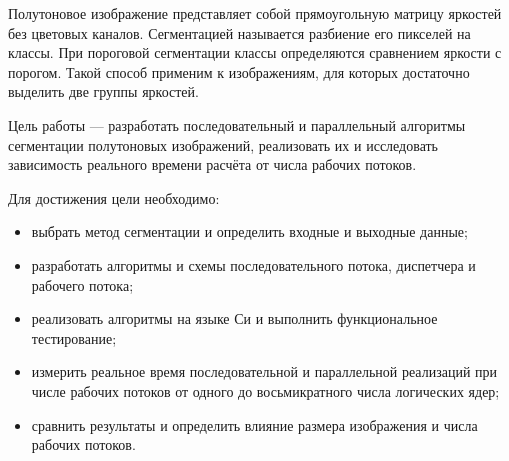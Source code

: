 Полутоновое изображение представляет собой прямоугольную матрицу яркостей без цветовых каналов. Сегментацией называется разбиение его пикселей на классы. При пороговой сегментации классы определяются сравнением яркости с порогом. Такой способ применим к изображениям, для которых достаточно выделить две группы яркостей.

Цель работы --- разработать последовательный и параллельный алгоритмы сегментации полутоновых изображений, реализовать их и исследовать зависимость реального времени расчёта от числа рабочих потоков.

Для достижения цели необходимо:
\begin{itemize}
\item выбрать метод сегментации и определить входные и выходные данные;
\item разработать алгоритмы и схемы последовательного потока, диспетчера и рабочего потока;
\item реализовать алгоритмы на языке Си и выполнить функциональное тестирование;
\item измерить реальное время последовательной и параллельной реализаций при числе рабочих потоков от одного до восьмикратного числа логических ядер;
\item сравнить результаты и определить влияние размера изображения и числа рабочих потоков.
\end{itemize}
